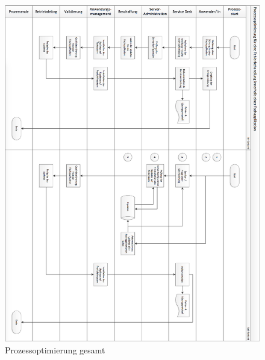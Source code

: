     \begin{figure}
	    \centering
	    \includegraphics[width=16cm]
	    {kapitel/anhang/prozessoptimierung_gesamt_hoch}
	    \caption*{Prozessoptimierung gesamt}
	    \label{fig_prozessoptimierung_gesamt}
    \end{figure}
